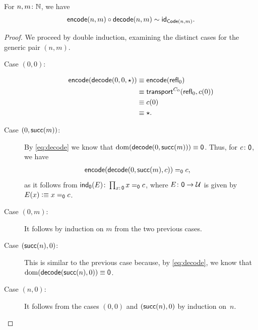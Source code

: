 \begin{thm}\label{thm:N-equality-encode-decode}
    For\/ $n,m\colon\N$, we have
    \[
        \mathsf{encode}(n,m)\circ\mathsf{decode}(n,m)
            \sim\mathsf{id}_{\mathsf{Code}(n,m)}.
    \]
\end{thm}

\begin{proof}
    We proceed by double induction, examining the distinct cases for the generic pair\/ $(n,m)$.
    \begin{description}
        \item[Case $(0,0)$:]
        \begin{align*}
            \mathsf{encode}(\mathsf{decode}(0,0,\mathsf{\star}))
                &\equiv\mathsf{encode}(\mathsf{refl}_0)\\
                &\equiv\mathsf{transport}^{C_0}(\mathsf{refl}_0,c(0))\\
                &\equiv c(0)\\
                &\equiv\mathsf{\star}.
        \end{align*}
        \item[Case $(0,\mathsf{succ}(m))$:] By \eqref{eq:decode} we know that $\mathrm{dom}(\mathsf{decode}(0,\mathsf{succ}(m)))\equiv\mathsf{0}$. Thus, for $c\colon\fun0$, we have
        \begin{align*}
            \mathsf{encode}(\mathsf{decode}(0,\mathsf{succ}(m),c))&\mathrel{=_{\mathsf{0}}}c,
        \end{align*}
        as it follows from $\fun{ind}_{\fun0}(E)\colon\prod_{x\colon\fun0}x\eq{\fun0}c$, where $E\colon\fun0\to\univ$ is given by $E(x)\mathrel{\vcentcolon}\equiv x\mathrel{=_{\mathsf{0}}}c$.

        \item[Case $(0,m)$:] It follows by induction on $m$ from the two previous cases.

        \item[Case $(\mathsf{succ}(n),0)$:] This is similar to the previous case because, by \eqref{eq:decode}, we know that $\mathrm{dom}(\mathsf{decode}(\mathsf{succ}(n),0))\equiv\mathsf{0}$.

         \item[Case $(n,0)$:] It follows from the cases $(0,0)$ and $(\mathsf{succ}(n),0)$ by induction on~$n$.


\end{description}
\end{proof}
